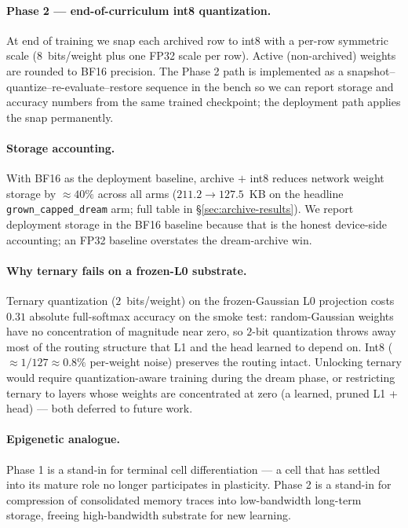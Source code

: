 \documentclass[11pt]{article}
\newcommand{\arm}[1]{\texttt{#1}}
\begin{document}
\paragraph{Phase 2 --- end-of-curriculum int8 quantization.}
At end of training we snap each archived row to int8 with a per-row
symmetric scale ($8$~bits/weight plus one FP32 scale per row). Active
(non-archived) weights are rounded to BF16 precision. The Phase 2 path
is implemented as a snapshot--quantize--re-evaluate--restore sequence
in the bench so we can report storage and accuracy numbers from the
same trained checkpoint; the deployment path applies the snap
permanently.

\paragraph{Storage accounting.}
With BF16 as the deployment baseline, archive $+$ int8 reduces network
weight storage by $\approx\!40\%$ across all arms ($211.2 \to
127.5$~KB on the headline \arm{grown\_capped\_dream} arm; full table
in \S\ref{sec:archive-results}). We report deployment storage in the
BF16 baseline because that is the honest device-side accounting; an
FP32 baseline overstates the dream-archive win.

\paragraph{Why ternary fails on a frozen-L0 substrate.}
Ternary quantization ($2$~bits/weight) on the frozen-Gaussian L0
projection costs $0.31$ absolute full-softmax accuracy on the smoke
test: random-Gaussian weights have no concentration of magnitude near
zero, so $2$-bit quantization throws away most of the routing
structure that L1 and the head learned to depend on. Int8
($\approx 1/127 \approx 0.8\%$ per-weight noise) preserves the routing
intact. Unlocking ternary would require quantization-aware training
during the dream phase, or restricting ternary to layers whose weights
are concentrated at zero (a learned, pruned L1 + head) --- both
deferred to future work.

\paragraph{Epigenetic analogue.}
Phase 1 is a stand-in for terminal cell differentiation --- a cell
that has settled into its mature role no longer participates in
plasticity. Phase 2 is a stand-in for compression of consolidated
memory traces into low-bandwidth long-term storage, freeing
high-bandwidth substrate for new learning.
\end{document}
